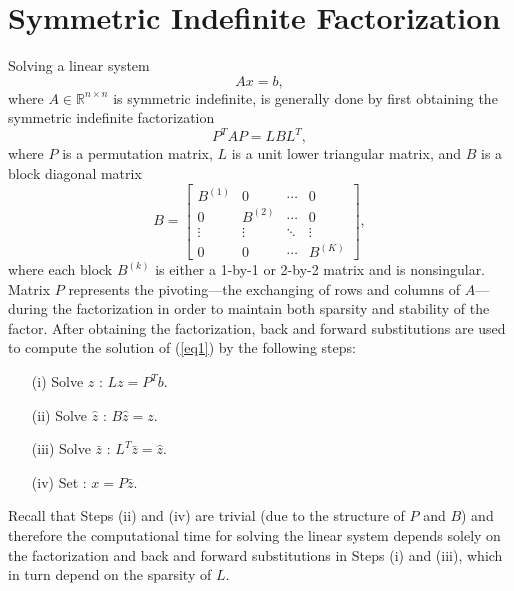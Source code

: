 \documentclass{article}
\begin{document}
\section{Symmetric Indefinite Factorization}\label{sec2}
Solving a linear system
\begin{equation}\label{eq1}
Ax = b,
\end{equation}
where $A \in \mathbb{R}^{n \times n}$ is symmetric indefinite, is generally done by first obtaining the symmetric indefinite factorization \begin{equation}\label{eq2}
P^{T}AP = LBL^{T},
\end{equation}
where $P$ is a permutation matrix, $L$ is a unit lower triangular matrix, and $B$ is a block diagonal matrix
\[
B=
\begin{bmatrix} B^{(1)}      & 0          &\cdots  & 0        \\     
                     0          & B^{(2)}      &\cdots  & 0        \\
                     \vdots  & \vdots &\ddots  & \vdots\\
                     0          & 0          &\cdots  & B^{(K)}    \end{bmatrix},
\]
where each block $B^{(k)}$ is either a 1-by-1 or 2-by-2 matrix and is nonsingular.  Matrix $P$ represents the pivoting---the exchanging of rows and columns of $A$---during the factorization in order to maintain both sparsity and stability of the factor.
After obtaining the factorization, back and forward substitutions are used to compute the solution of (\ref{eq1}) by the following steps:
\begin{enumerate}
\item[(i)]\label{step1} Solve $z$ : $Lz  =   P^T b$.
\item[(ii)]\label{step2} Solve $\hat{z}$ : $B\hat{z} = z$.
\item[(iii)]\label{step3}Solve $\bar{z}$ : $L^T\bar{z}= \hat{z}$.
\item[(iv)]\label{step4}Set : $x=P\bar{z}$.
\end{enumerate}


Recall that Steps (ii) and (iv) are trivial (due to the structure of $P$ and $B$) and therefore the computational time for solving the linear system depends solely on the factorization and back and forward substitutions in Steps (i) and (iii), which in turn depend on the sparsity of $L$.  
\end{document}

